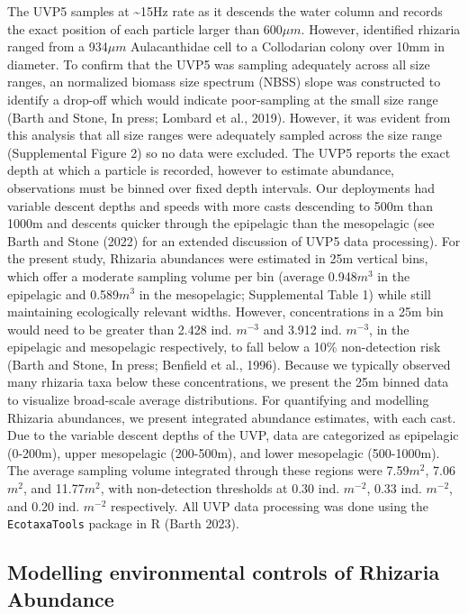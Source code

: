 \documentclass[
]{article}
\begin{document}
The UVP5 samples at \textasciitilde15Hz rate as it descends the water
column and records the exact position of each particle larger than
600\(\mu m\). However, identified rhizaria ranged from a 934\(\mu m\)
Aulacanthidae cell to a Collodarian colony over 10mm in diameter. To
confirm that the UVP5 was sampling adequately across all size ranges, an
normalized biomass size spectrum (NBSS) slope was constructed to
identify a drop-off which would indicate poor-sampling at the small size
range (Barth and Stone, In press; Lombard et al., 2019). However, it was
evident from this analysis that all size ranges were adequately sampled
across the size range (Supplemental Figure 2) so no data were excluded.
The UVP5 reports the exact depth at which a particle is recorded,
however to estimate abundance, observations must be binned over fixed
depth intervals. Our deployments had variable descent depths and speeds
with more casts descending to 500m than 1000m and descents quicker
through the epipelagic than the mesopelagic (see Barth and Stone (2022)
for an extended discussion of UVP5 data processing). For the present
study, Rhizaria abundances were estimated in 25m vertical bins, which
offer a moderate sampling volume per bin (average 0.948\(m^3\) in the
epipelagic and 0.589\(m^3\) in the mesopelagic; Supplemental Table 1)
while still maintaining ecologically relevant widths. However,
concentrations in a 25m bin would need to be greater than 2.428 ind.
\(m^{-3}\) and 3.912 ind. \(m^{-3}\), in the epipelagic and mesopelagic
respectively, to fall below a 10\% non-detection risk (Barth and Stone,
In press; Benfield et al., 1996). Because we typically observed many
rhizaria taxa below these concentrations, we present the 25m binned data
to visualize broad-scale average distributions. For quantifying and
modelling Rhizaria abundances, we present integrated abundance
estimates, with each cast. Due to the variable descent depths of the
UVP, data are categorized as epipelagic (0-200m), upper mesopelagic
(200-500m), and lower mesopelagic (500-1000m). The average sampling
volume integrated through these regions were 7.59\(m^2\), 7.06\(m^2\),
and 11.77\(m^2\), with non-detection thresholds at 0.30 ind. \(m^{-2}\),
0.33 ind. \(m^{-2}\), and 0.20 ind. \(m^{-2}\) respectively. All UVP
data processing was done using the \texttt{EcotaxaTools} package in R
(Barth 2023).

\hypertarget{modelling-environmental-controls-of-rhizaria-abundance}{%
\subsection{Modelling environmental controls of Rhizaria
Abundance}\label{modelling-environmental-controls-of-rhizaria-abundance}}
\end{document}
